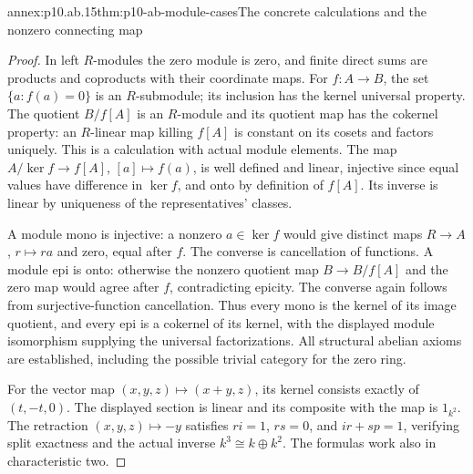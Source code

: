 \begin{annexitem}{annex:p10.ab.15}{thm:p10-ab-module-cases}{The concrete calculations and the nonzero connecting map}
\begin{proof}
In left \(R\)-modules the zero module is zero, and finite direct sums
are products and coproducts with their coordinate maps. For \(f:A\to B\),
the set \(\{a:f(a)=0\}\) is an \(R\)-submodule; its inclusion
has the kernel universal property. The quotient \(B/f[A]\) is an
\(R\)-module and its quotient map has the cokernel property: an
\(R\)-linear map killing \(f[A]\) is constant on its cosets and
factors uniquely. This is a calculation with actual module elements.
The map \(A/\ker f\to f[A]\), \([a]\mapsto f(a)\), is well
defined and linear, injective since equal values have difference in
\(\ker f\), and onto by definition of \(f[A]\). Its inverse is
linear by uniqueness of the representatives' classes.

A module mono is injective: a nonzero \(a\in\ker f\) would give
distinct maps \(R\to A\), \(r\mapsto ra\) and zero, equal after
\(f\). The converse is cancellation of functions. A module epi is
onto: otherwise the nonzero quotient map \(B\to B/f[A]\) and the
zero map would agree after \(f\), contradicting epicity. The converse
again follows from surjective-function cancellation. Thus every mono
is the kernel of its image quotient, and every epi is a cokernel of its
kernel, with the displayed module isomorphism supplying the universal
factorizations. All structural abelian axioms are established, including
the possible trivial category for the zero ring.

For the vector map \((x,y,z)\mapsto(x+y,z)\), its kernel consists
exactly of \((t,-t,0)\). The displayed section is linear and its
composite with the map is \(1_{k^2}\). The retraction
\((x,y,z)\mapsto-y\) satisfies \(ri=1\), \(rs=0\), and
\(ir+sp=1\), verifying split exactness and the actual inverse
\(k^3\cong k\oplus k^2\). The formulas work also in characteristic two.


\end{proof}
\end{annexitem}
